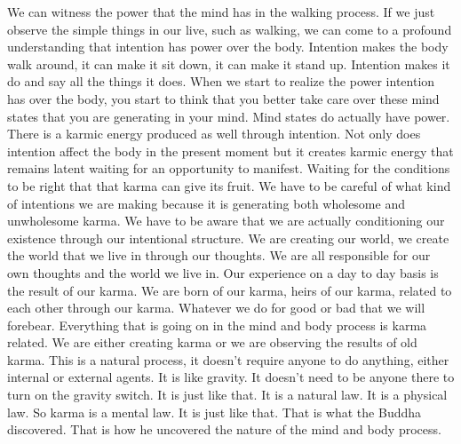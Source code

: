 \documentclass[letterpaper,10pt,english]{sphinxmanual}
\begin{document}
\sphinxAtStartPar
We  can  witness  the  power  that  the  mind  has  in  the  walking  process.
If  we  just  observe  the  simple  things  in  our  live,  such  as  walking,  we  can
come to a profound understanding that intention has power over the body.
Intention makes the body walk around, it can make it sit down, it can make
it stand up. Intention makes it do and say all the things it does. When we
start to realize the power intention has over the body, you start to think that
you better take care over these mind states that you are generating in your
mind.  Mind  states  do  actually  have  power.  There  is  a  karmic  energy  produced as well through intention. Not only does intention affect the body in
the present moment but it creates karmic energy that remains latent waiting
  for  an  opportunity  to  manifest. Waiting  for  the  conditions  to  be  right  that
that karma can give its fruit. We have to be careful of what kind of intentions
we are making because it is generating both wholesome and unwholesome
karma. We have to be aware that we are actually conditioning our existence
through our intentional structure. We are creating our world, we create the
world that we live in through our thoughts. We are all responsible for our
own thoughts and the world we live in. Our experience on a day to day basis
is  the  result  of  our  karma. We  are  born  of  our  karma,  heirs  of  our  karma,
related to each other through our karma. Whatever we do for good or bad
that we will forebear. Everything that is going on in the mind and body process is karma related. We are either creating karma or we are observing the
results of old karma. This is a natural process, it doesn’t require anyone to
do anything, either internal or external agents. It is like gravity. It doesn’t
need to be anyone there to turn on the gravity switch. It is just like that. It is
a natural law. It is a physical law. So karma is a mental law. It is just like that.
That is what the Buddha discovered. That is how he uncovered the nature of
the mind and body process.
\end{document}
